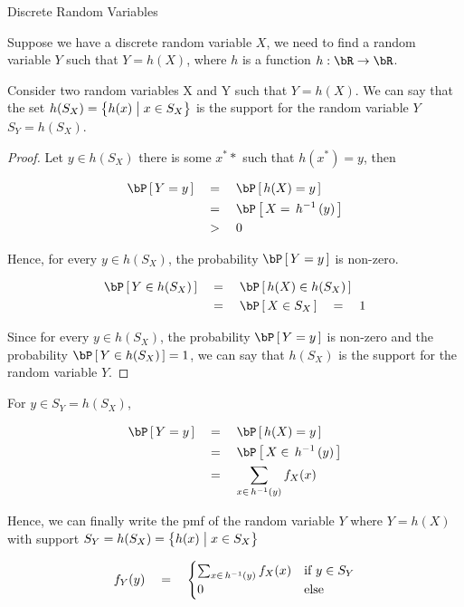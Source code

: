 \documentclass{article}
\begin{document}
\makeheader%

\begin{ssection}{Discrete Random Variables}

	Suppose we have a discrete random variable $X$, we need to find a random variable $Y$ such that $Y = h(X)$, where $h$ is a function $h : \bR \ra \bR$. \br

	\begin{theorem}
		Consider two random variables X and Y such that $Y = h(X)$. We can say that the set $h(S_X) = \left\{ {h(x) \;\big|\; x \in S_X} \right\}$ is the support for the random variable $Y$  $S_Y = h(S_X)$.
	\end{theorem}

	\begin{proof}
		Let $y \in h(S_X)$  there is some $x^*\ast$ such that $h(x^\ast) = y$, then

		\begin{align*}
			\prob{Y = y}	&\eq	\prob{h(X) = y} \\
							&\eq	\prob{X = \funcinv{h}{y}} \\
							&\qgt	0
		\end{align*}

		Hence, for every $y \in h(S_X)$, the probability $\prob{Y = y}$ is non-zero.

		\begin{align*}
			\prob{Y \in h(S_X)}	&\eq	\prob{h(X) \in h(S_X)} \\
								&\eq	\prob{X \in S_X} \eq 1
		\end{align*}

		Since for every $y \in h(S_X)$, the probability $\prob{Y = y}$ is non-zero and the probability $\prob{Y \in h(S_X)} = 1$, we can say that $h(S_X)$ is the support for the random variable $Y$.
	\end{proof}

	For $y \in S_Y = h(S_X)$,

	\begin{align*}
		\prob{Y = y}	&\eq	\prob{h(X) = y} \\
						&\eq	\prob{X \in \funcinv{h}{y}} \\
						&\eq	\sum_{x \in \funcinv{h}{y}} f_X(x)
	\end{align*}

	Hence, we can finally write the pmf of the random variable $Y$ where $Y = h(X)$ with support $S_Y = h(S_X) = \left\{ {h(x) \;\big|\; x \in S_X} \right\}$

	\begin{align*}
		f_Y(y)	\eq	\begin{cases}
			\sum_{x \in \funcinv{h}{y}} f_X(x)	&	\mt{if} y \in S_Y \\
			0									&	\mt{else}
		\end{cases}
	\end{align*}

\end{ssection}
\end{document}
